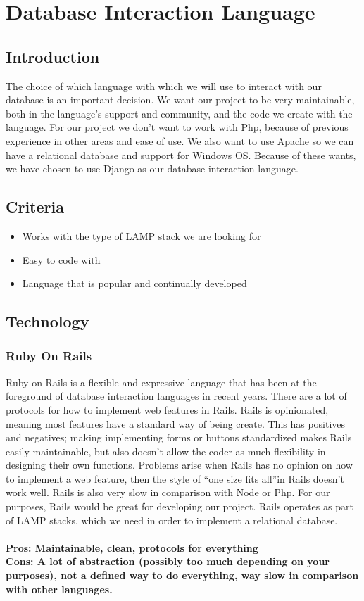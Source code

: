 \documentclass[draftclsnofoot,onecolumn,letterpaper,10pt,compsoc]{IEEEtran}
\begin{document}
		\section{Database Interaction Language}
		\subsection{Introduction}
			The choice of which language with which we will use to interact with our database is an important decision.
			We want our project to be very maintainable, both in the language's support and community, and the code we create with the language.
			For our project we don’t want to work with Php, because of previous experience in other areas and ease of use.
			We also want to use Apache so we can have a relational database and support for Windows OS.
			Because of these wants, we have chosen to use Django as our database interaction language.
			\subsection{Criteria}
			\begin{itemize}
			\item Works with the type of LAMP stack we are looking for
			\item Easy to code with
			\item Language that is popular and continually developed
			\end{itemize}

      \subsection{Technology}
  			\subsubsection{Ruby On Rails}
				Ruby on Rails is a flexible and expressive language that has been at the foreground of database interaction languages in recent years.
				There are a lot of protocols for how to implement web features in Rails.
				Rails is opinionated, meaning most features have a standard way of being create\cite{Medium}.
				This has positives and negatives; making implementing forms or buttons standardized makes Rails easily maintainable, but also doesn't allow the coder as much flexibility in designing their own functions.
				Problems arise when Rails has no opinion on how to implement a web feature, then the style of \textquotedblleft one size fits all\textquotedblright in Rails doesn't work well\cite{Medium}.
				Rails is also very slow in comparison with Node or Php\cite{Medium}.
				For our purposes, Rails would be great for developing our project.
				Rails operates as part of LAMP stacks, which we need in order to implement a relational database.
				\\ \\
				\textbf{Pros: Maintainable, clean, protocols for everything}
				\\
				\textbf{Cons: A lot of abstraction (possibly too much depending on your purposes), not a defined way to do everything, way slow in comparison with other languages.}
\end{document}
